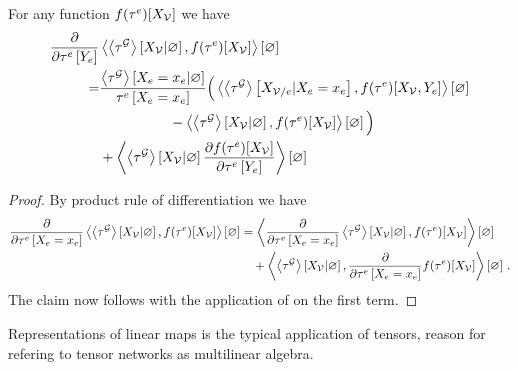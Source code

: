 \begin{lemma}
    \label{lem:difMNExpectation}
    For any function $f(\tau^{e})[X_{\mathcal{V}}]$ we have
    \begin{align*}
        \frac{\partial }{\partial \tau^{e}\left[Y_{e}\right]} &
        \left\langle \left\langle \tau^{\mathcal{G}}\right\rangle \left[ X_{\mathcal{V}} | \varnothing \right],f(\tau^{e})[X_{\mathcal{V}}]\right\rangle \left[ \varnothing \right] \\
        = &
        \frac{\left\langle \tau^{\mathcal{G}}\right\rangle \left[ X_{e}=x_{e} | \varnothing \right]}{\tau^{e}\left[X_{e}=x_{e}\right]}
        \Big( \left\langle \left\langle \tau^{\mathcal{G}}\right\rangle \left[ X_{\mathcal{V}/e} | X_{e}=x_{e} \right], f(\tau^{e})[X_{\mathcal{V}},Y_{e}]\right\rangle \left[ \varnothing \right] \\
        & \quad \quad \quad \quad \quad - \left\langle \left\langle \tau^{\mathcal{G}}\right\rangle \left[ X_{\mathcal{V}} | \varnothing \right], f(\tau^{e})[X_{\mathcal{V}}]\right\rangle \left[ \varnothing \right]
        \Big) \\
        & + \left\langle  \left\langle \tau^{\mathcal{G}}\right\rangle \left[ X_{\mathcal{V}} | \varnothing \right]
        \frac{\partial f(\tau^{e})[X_{\mathcal{V}}]}{\partial \tau^{e}\left[Y_{e}\right]}
        \right\rangle \left[ \varnothing \right]
    \end{align*}
\end{lemma}
\begin{proof}
    By product rule of differentiation we have
    \begin{align*}
        \frac{\partial }{\partial \tau^{e}\left[X_{e}=x_{e}\right]} \left\langle \left\langle \tau^{\mathcal{G}}\right\rangle \left[ X_{\mathcal{V}} | \varnothing \right],f(\tau^{e})[X_{\mathcal{V}}]\right\rangle \left[ \varnothing \right]
        & =  \left\langle \frac{\partial }{\partial \tau^{e}\left[X_{e}=x_{e}\right]}\left\langle \tau^{\mathcal{G}}\right\rangle \left[ X_{\mathcal{V}} | \varnothing \right],f(\tau^{e})[X_{\mathcal{V}}]\right\rangle \left[ \varnothing \right] \\
        & \quad +  \left\langle \left\langle \tau^{\mathcal{G}}\right\rangle \left[ X_{\mathcal{V}} | \varnothing \right],\frac{\partial }{\partial \tau^{e}\left[X_{e}=x_{e}\right]}f(\tau^{e})[X_{\mathcal{V}}]\right\rangle \left[ \varnothing \right]  \, .
    \end{align*}
    The claim now follows with the application of  on the first term.
\end{proof}


Representations of linear maps is the typical application of tensors, reason for refering to tensor networks as multilinear algebra.
